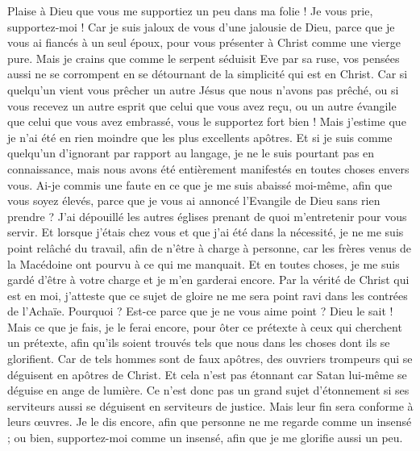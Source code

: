 \begin{multicols}{2}
\VerseOne{}Plaise à Dieu que vous me supportiez un peu dans ma folie ! Je vous prie, supportez-moi !
Car je suis jaloux de vous d'une jalousie de Dieu, parce que je vous ai fiancés à un seul époux, pour vous présenter à Christ comme une vierge pure.
Mais je crains que comme le serpent séduisit Eve par sa ruse, vos pensées aussi ne se corrompent en se détournant de la simplicité qui est en Christ.
Car si quelqu'un vient vous prêcher un autre Jésus que nous n'avons pas prêché, ou si vous recevez un autre esprit que celui que vous avez reçu, ou un autre évangile que celui que vous avez embrassé, vous le supportez fort bien !
Mais j'estime que je n'ai été en rien moindre que les plus excellents apôtres.
Et si je suis comme quelqu'un d'ignorant par rapport au langage, je ne le suis pourtant pas en connaissance, mais nous avons été entièrement manifestés en toutes choses envers vous.
Ai-je commis une faute en ce que je me suis abaissé moi-même, afin que vous soyez élevés, parce que je vous ai annoncé l'Evangile de Dieu sans rien prendre ? 
J'ai dépouillé les autres églises prenant de quoi m'entretenir pour vous servir. Et lorsque j'étais chez vous et que j'ai été dans la nécessité, je ne me suis point relâché du travail, afin de n'être à charge à personne,
car les frères venus de la Macédoine ont pourvu à ce qui me manquait. Et en toutes choses, je me suis gardé d'être à votre charge et je m'en garderai encore.
Par la vérité de Christ qui est en moi, j'atteste que ce sujet de gloire ne me sera point ravi dans les contrées de l'Achaïe.
Pourquoi ? Est-ce parce que je ne vous aime point ? Dieu le sait !
Mais ce que je fais, je le ferai encore, pour ôter ce prétexte à ceux qui cherchent un prétexte, afin qu'ils soient trouvés tels que nous dans les choses dont ils se glorifient.
Car de tels hommes sont de faux apôtres, des ouvriers trompeurs qui se déguisent en apôtres de Christ.
Et cela n'est pas étonnant car Satan lui-même se déguise en ange de lumière.
Ce n'est donc pas un grand sujet d'étonnement si ses serviteurs aussi se déguisent en serviteurs de justice. Mais leur fin sera conforme à leurs œuvres.
Je le dis encore, afin que personne ne me regarde comme un insensé ; ou bien, supportez-moi comme un insensé, afin que je me glorifie aussi un peu.

\end{multicols}
